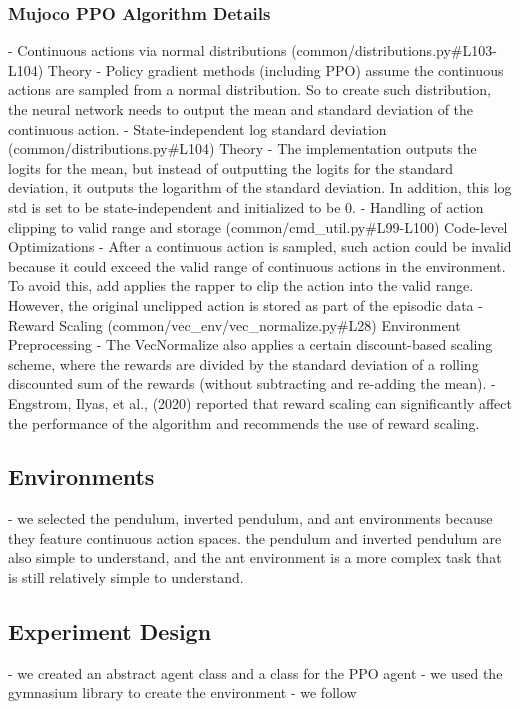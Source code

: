 \documentclass{article}
\begin{document}
\subsubsection{Mujoco PPO Algorithm Details}
- Continuous actions via normal distributions (common/distributions.py#L103-L104) Theory
  - Policy gradient methods (including PPO) assume the continuous actions are sampled from a normal distribution. So to create such distribution, the neural network needs to output the mean and standard deviation of the continuous action.
- State-independent log standard deviation (common/distributions.py#L104) Theory
  - The implementation outputs the logits for the mean, but instead of outputting the logits for the standard deviation, it outputs the logarithm of the standard deviation. In addition, this log std is set to be state-independent and initialized to be 0.
- Handling of action clipping to valid range and storage (common/cmd_util.py#L99-L100) Code-level Optimizations
  - After a continuous action is sampled, such action could be invalid because it could exceed the valid range of continuous actions in the environment. To avoid this, add applies the rapper to clip the action into the valid range. However, the original unclipped action is stored as part of the episodic data
- Reward Scaling (common/vec_env/vec_normalize.py#L28) Environment Preprocessing
  - The VecNormalize also applies a certain discount-based scaling scheme, where the rewards are divided by the standard deviation of a rolling discounted sum of the rewards (without subtracting and re-adding the mean).
  - Engstrom, Ilyas, et al., (2020) \cite{Engstrom2020Implementation} reported that reward scaling can significantly affect the performance of the algorithm and recommends the use of reward scaling.

\subsection{Environments}
- we selected the pendulum, inverted pendulum, and ant environments because they feature continuous action spaces. the pendulum and inverted pendulum are also simple to understand, and the ant environment is a more complex task that is still relatively simple to understand.

\subsection{Experiment Design}
- we created an abstract agent class and a class for the PPO agent
- we used the gymnasium library to create the environment
- we follow
\end{document}
